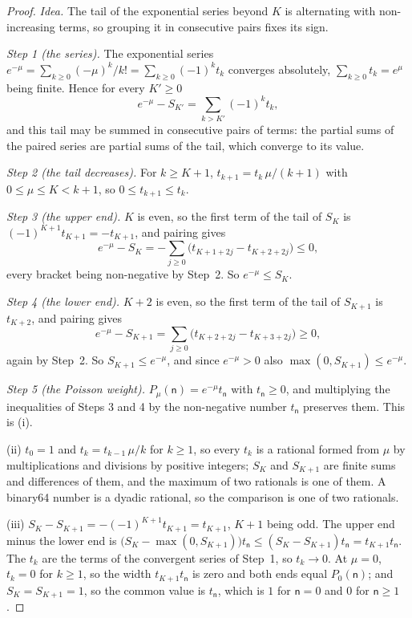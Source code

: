 \begin{proof}
\emph{Idea.} The tail of the exponential series beyond $K$ is alternating with
non-increasing terms, so grouping it in consecutive pairs fixes its sign.

\emph{Step 1 (the series).} The exponential series
$e^{-\mu}=\sum_{k\ge0}(-\mu)^k/k!=\sum_{k\ge0}(-1)^kt_k$ converges absolutely,
$\sum_{k\ge0}t_k=e^{\mu}$ being finite. Hence for every $K'\ge0$
\begin{equation*}
  e^{-\mu}-S_{K'}=\sum_{k>K'}(-1)^kt_k ,
\end{equation*}
and this tail may be summed in consecutive pairs of terms: the partial sums of
the paired series are partial sums of the tail, which converge to its value.

\emph{Step 2 (the tail decreases).} For $k\ge K+1$,
$t_{k+1}=t_k\,\mu/(k+1)$ with $0\le\mu\le K<k+1$, so $0\le t_{k+1}\le t_k$.

\emph{Step 3 (the upper end).} $K$ is even, so the first term of the tail of
$S_K$ is $(-1)^{K+1}t_{K+1}=-t_{K+1}$, and pairing gives
\begin{equation*}
  e^{-\mu}-S_K=-\sum_{j\ge0}\big(t_{K+1+2j}-t_{K+2+2j}\big)\le0 ,
\end{equation*}
every bracket being non-negative by Step~2. So $e^{-\mu}\le S_K$.

\emph{Step 4 (the lower end).} $K+2$ is even, so the first term of the tail of
$S_{K+1}$ is $t_{K+2}$, and pairing gives
\begin{equation*}
  e^{-\mu}-S_{K+1}=\sum_{j\ge0}\big(t_{K+2+2j}-t_{K+3+2j}\big)\ge0 ,
\end{equation*}
again by Step~2. So $S_{K+1}\le e^{-\mu}$, and since $e^{-\mu}>0$ also
$\max(0,S_{K+1})\le e^{-\mu}$.

\emph{Step 5 (the Poisson weight).} $P_\mu(\mathsf{n})=e^{-\mu}t_{\mathsf{n}}$
with $t_{\mathsf{n}}\ge0$, and multiplying the inequalities of Steps 3 and 4 by
the non-negative number $t_{\mathsf{n}}$ preserves them. This is (i).

(ii) $t_0=1$ and $t_k=t_{k-1}\,\mu/k$ for $k\ge1$, so every $t_k$ is a rational
formed from $\mu$ by multiplications and divisions by positive integers; $S_K$
and $S_{K+1}$ are finite sums and differences of them, and the maximum of two
rationals is one of them. A binary64 number is a dyadic rational, so the
comparison is one of two rationals.

(iii) $S_K-S_{K+1}=-(-1)^{K+1}t_{K+1}=t_{K+1}$, $K+1$ being odd. The upper end
minus the lower end is
$\big(S_K-\max(0,S_{K+1})\big)t_{\mathsf{n}}\le(S_K-S_{K+1})t_{\mathsf{n}}
=t_{K+1}t_{\mathsf{n}}$. The $t_k$ are the terms of the convergent series of
Step~1, so $t_k\to0$. At $\mu=0$, $t_k=0$ for $k\ge1$, so the width
$t_{K+1}t_{\mathsf{n}}$ is zero and both ends equal $P_0(\mathsf{n})$; and
$S_K=S_{K+1}=1$, so the common value is $t_{\mathsf{n}}$, which is $1$ for
$\mathsf{n}=0$ and $0$ for $\mathsf{n}\ge1$.


\end{proof}
